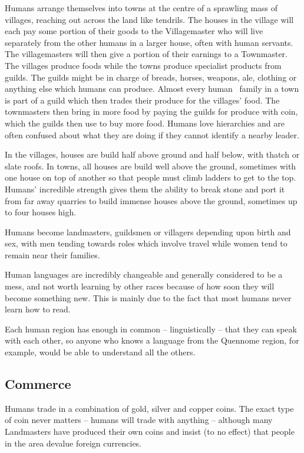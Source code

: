 \documentclass[titlepage,a4paper,openany]{book}
\begin{document}
\begin{multicols}{2}

Humans arrange themselves into towns at the centre of a sprawling mass of villages, reaching out across the land like tendrils. The houses in the village will each pay some portion of their goods to the Villagemaster who will live separately from the other humans in a larger house, often with human servants. The villagemasters will then give a portion of their earnings to a Townmaster. The villages produce foods while the towns produce specialist products from guilds. The guilds might be in charge of breads, horses, weapons, ale, clothing or anything else which humans can produce. Almost every human \ family in a town is part of a guild which then trades their produce for the villages' food. The townmasters then bring in more food by paying the guilds for produce with coin, which the guilds then use to buy more food. Humans love hierarchies and are often confused about what they are doing if they cannot identify a nearby leader.

In the villages, houses are build half above ground and half below, with thatch or slate roofs. In towns, all houses are build well above the ground, sometimes with one house on top of another so that people must climb ladders to get to the top. Humans' incredible strength gives them the ability to break stone and port it from far away quarries to build immense houses above the ground, sometimes up to four houses high.

Humans become landmasters, guildsmen or villagers depending upon birth and sex, with men tending towards roles which involve travel while women tend to remain near their families.

Human languages are incredibly changeable and generally considered to be a mess, and not worth learning by other races because of how soon they will become something new.
This is mainly due to the fact that most humans never learn how to read.

Each human region has enough in common -- linguistically -- that they can speak with each other, so anyone who knows a language from the Quennome region, for example, would be able to understand all the others.

\subsection{Commerce}

Humans trade in a combination of gold, silver and copper coins. The exact type of coin never matters -- humans will trade with anything -- although many Landmasters have produced their own coins and insist (to no effect) that people in the area devalue foreign currencies.


\end{multicols}
\end{document}
